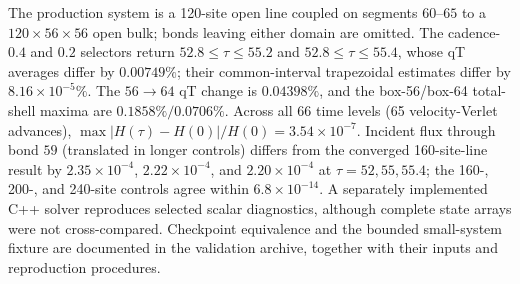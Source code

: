 \documentclass[10pt,aps,pre,onecolumn,notitlepage,nofootinbib]{revtex4-2}
\begin{document}
The production system is a 120-site open line coupled on segments $60$--$65$ to a $120\times56\times56$ open bulk; bonds leaving either domain are omitted. The cadence-$0.4$ and $0.2$ selectors return $52.8\leq\tau\leq55.2$ and $52.8\leq\tau\leq55.4$, whose qT averages differ by $0.00749\%$; their common-interval trapezoidal estimates differ by $8.16\times10^{-5}\%$. The $56\to64$ qT change is $0.04398\%$, and the box-56/box-64 total-shell maxima are $0.1858\%/0.0706\%$. Across all 66 time levels (65 velocity-Verlet advances), $\max|H(\tau)-H(0)|/H(0)=3.54\times10^{-7}$. Incident flux through bond $59$ (translated in longer controls) differs from the converged 160-site-line result by $2.35\times10^{-4}$, $2.22\times10^{-4}$, and $2.20\times10^{-4}$ at $\tau=52,55,55.4$; the 160-, 200-, and 240-site controls agree within $6.8\times10^{-14}$. A separately implemented C++ solver reproduces selected scalar diagnostics, although complete state arrays were not cross-compared. Checkpoint equivalence and the bounded small-system fixture are documented in the validation archive, together with their inputs and reproduction procedures.
\end{document}

